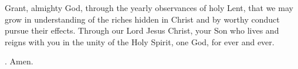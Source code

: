 \lettrine[lines=3]{G}{}rant, almighty God,
through the yearly observances of holy Lent,
that we may grow in understanding
of the riches hidden in Christ
and by worthy conduct pursue their effects.
Through our Lord Jesus Christ, your Son
who lives and reigns with you in the unity of the Holy Spirit,
one God, for ever and ever. \par \Rbar. Amen.
